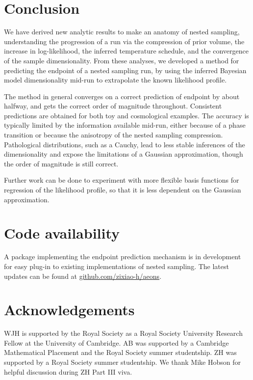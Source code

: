 \documentclass[usenatbib]{mnras}
\begin{document}
\section{Conclusion}
We have derived new analytic results to make an anatomy of nested sampling, understanding the progression of a run via the compression of prior volume, the increase in log-likelihood, the inferred temperature schedule, and the convergence of the sample dimensionality. From these analyses, we developed a method for predicting the endpoint of a nested sampling run, by using the inferred Bayesian model dimensionality mid-run to extrapolate the known likelihood profile. 
\par
The method in general converges on a correct prediction of endpoint by about halfway, and gets the correct order of magnitude throughout. Consistent predictions are obtained for both toy and cosmological examples. The accuracy is typically limited by the information available mid-run, either because of a phase transition or because the anisotropy of the nested sampling compression. Pathological distributions, such as a Cauchy, lead to less stable inferences of the dimensionality and expose the limitations of a Gaussian approximation, though the order of magnitude is still correct.
\par
Further work can be done to experiment with more flexible basis functions for regression of the likelihood profile, so that it is less dependent on the Gaussian approximation.

\section*{Code availability}
A package implementing the endpoint prediction mechanism is in development for easy plug-in to existing implementations of nested sampling. The latest updates can be found at \href{https://github.com/zixiao-h/aeons}{github.com/zixiao-h/aeons}.

\section*{Acknowledgements}
WJH is supported by the Royal Society as a Royal Society University Research Fellow at the University of Cambridge. AB was supported by a Cambridge Mathematical Placement and the Royal Society summer studentship. ZH was supported by a Royal Society summer studentship. We thank Mike Hobson for helpful discussion during ZH Part III viva.


\appendix
\end{document}
